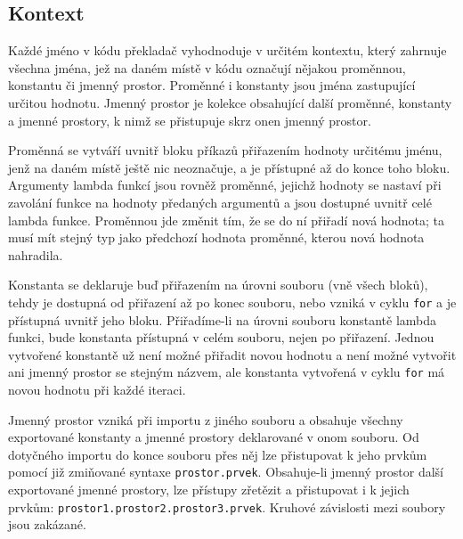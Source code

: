 \documentclass[a4paper,12pt]{article}
\begin{document}
\subsection{Kontext}
Každé jméno v kódu překladač vyhodnoduje v určitém kontextu, který zahrnuje všechna jména, jež na daném místě v kódu označují nějakou proměnnou, konstantu či jmenný prostor. Proměnné i konstanty jsou jména zastupující určitou hodnotu. Jmenný prostor je kolekce obsahující další proměnné, konstanty a jmenné prostory, k nimž se přistupuje skrz onen jmenný prostor.

Proměnná se vytváří uvnitř bloku příkazů přiřazením hodnoty určitému jménu, jenž na daném místě ještě nic neoznačuje, a je přístupné až do konce toho bloku. Argumenty lambda funkcí jsou rovněž proměnné, jejichž hodnoty se nastaví při zavolání funkce na hodnoty předaných argumentů a jsou dostupné uvnitř celé lambda funkce. Proměnnou jde změnit tím, že se do ní přiřadí nová hodnota; ta musí mít stejný typ jako předchozí hodnota proměnné, kterou nová hodnota nahradila.

Konstanta se deklaruje buď přiřazením na úrovni souboru (vně všech bloků), tehdy je dostupná od přiřazení až po konec souboru, nebo vzniká v cyklu \texttt{for} a je přístupná uvnitř jeho bloku. Přiřadíme-li na úrovni souboru konstantě lambda funkci, bude konstanta přístupná v celém souboru, nejen po přiřazení. Jednou vytvořené konstantě už není možné přiřadit novou hodnotu a není možné vytvořit ani jmenný prostor se stejným názvem, ale konstanta vytvořená v cyklu \texttt{for} má novou hodnotu při každé iteraci.

Jmenný prostor vzniká při importu z jiného souboru a obsahuje všechny exportované konstanty a jmenné prostory deklarované v onom souboru. Od dotyčného importu do konce souboru přes něj lze přistupovat k jeho prvkům pomocí již zmiňované syntaxe \texttt{prostor.prvek}. Obsahuje-li jmenný prostor další exportované jmenné prostory, lze přístupy zřetězit a přistupovat i k jejich prvkům: \texttt{prostor1.prostor2.prostor3.prvek}. Kruhové závislosti mezi soubory jsou zakázané.
\end{document}
